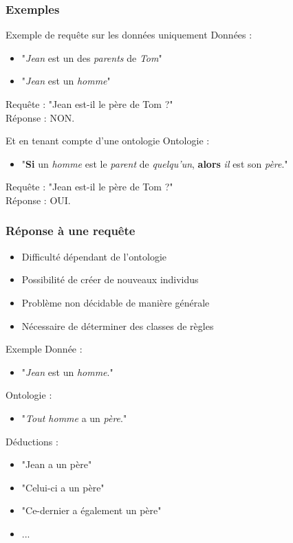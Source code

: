 \begin{frame}[t]
	\frametitle{Exemples}
	\begin{exampleblock}{Exemple de requête sur les données uniquement}
		Données :
		\begin{itemize}
			\item "{\em Jean} est un des {\em parents} de {\em Tom}"
			\item "{\em Jean} est un {\em homme}"
		\end{itemize}
		Requête : "Jean est-il le père de Tom ?"\\
		Réponse : NON.
	\end{exampleblock}
	\begin{exampleblock}{Et en tenant compte d'une ontologie}
		Ontologie :
		\begin{itemize}
			\item "{\bf Si} un {\em homme} est le {\em parent} de {\em quelqu'un}, {\bf
			alors} {\em il} est son {\em père}." 
		\end{itemize}
		Requête : "Jean est-il le père de Tom ?"\\
		Réponse : OUI.
	\end{exampleblock}
\end{frame}
\begin{frame}[t]
	\frametitle{Réponse à une requête}
	\begin{itemize}
		\item Difficulté dépendant de l'ontologie
		\item Possibilité de créer de nouveaux individus
		\item Problème non décidable de manière générale
		\item Nécessaire de déterminer des classes de règles
	\end{itemize}
	\begin{exampleblock}{Exemple}
		Donnée :
		\begin{itemize}
			\item "{\em Jean} est un {\em homme}."
		\end{itemize}
		Ontologie :
		\begin{itemize}
			\item "{\em Tout homme} a un {\em père}."
		\end{itemize}
		Déductions :
		\begin{itemize}
			\item "Jean a un père"
			\item "Celui-ci a un père"
			\item "Ce-dernier a également un père"
			\item ...
		\end{itemize}
	\end{exampleblock}
\end{frame}

